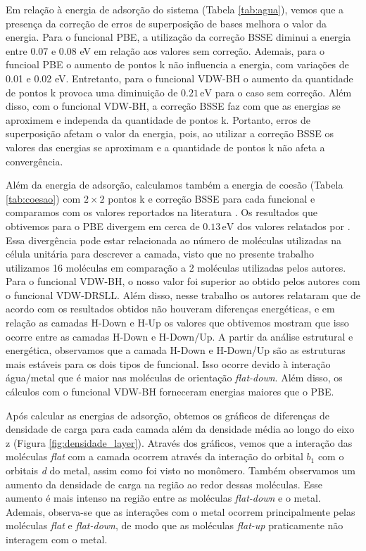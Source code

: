 
Em relação à energia de adsorção do sistema (Tabela \ref{tab:agua}), vemos que a presença da correção de erros de superposição de bases melhora o valor da energia. Para o funcional PBE, a utilização da correção BSSE diminui a energia entre 0.07 e 0.08 eV em relação aos valores sem correção. Ademais, para o funcioal PBE o aumento de pontos k não influencia a energia, com variações de 0.01 e 0.02 eV. Entretanto, para o funcional VDW-BH o aumento da quantidade de pontos k provoca uma diminuição de $ 0.21\,\si{\eV}$ para o caso sem correção. Além disso, com o funcional VDW-BH, a correção BSSE faz com que as energias se aproximem e independa da quantidade de pontos k. Portanto, erros de superposição afetam o valor da energia, pois, ao utilizar a correção BSSE os valores das energias se aproximam e a quantidade de pontos k não afeta a convergência.

Além da energia de adsorção, calculamos também a energia de coesão (Tabela \ref{tab:coesao}) com $2\times2$ pontos k e correção BSSE para cada funcional e comparamos com os valores reportados na literatura \cite{adrien}. Os resultados que obtivemos para o PBE divergem em cerca de $ 0.13\,\si{\eV} $ dos valores relatados por \citeauthor{adrien}. Essa divergência pode estar relacionada ao número de moléculas utilizadas na célula unitária para descrever a camada, visto que no presente trabalho utilizamos 16 moléculas em comparação a 2 moléculas utilizadas pelos autores. Para o funcional VDW-BH, o nosso valor foi superior ao obtido pelos autores com o funcional VDW-DRSLL. Além disso, nesse trabalho os autores relataram que de acordo com os resultados obtidos não houveram diferenças energéticas, e em relação as camadas H-Down e H-Up os valores que obtivemos mostram que isso ocorre entre as camadas H-Down e H-Down/Up. A partir da análise estrutural e energética, observamos que a camada H-Down e H-Down/Up são as estruturas mais estáveis para os dois tipos de funcional. Isso ocorre devido à interação água/metal que é maior nas moléculas de orientação \textit{flat-down}. Além disso, os cálculos com o funcional VDW-BH forneceram energias maiores que o PBE. 



Após calcular as energias de adsorção, obtemos os gráficos de diferenças de densidade de carga para cada camada além da densidade média ao longo do eixo z (Figura \ref{fig:densidade_layer}). Através dos gráficos, vemos que a interação das moléculas \textit{flat} com a camada ocorrem através da interação do orbital $ b_1$ com o orbitais \textit{d} do metal, assim como foi visto no monômero. Também observamos um aumento da densidade de carga na região ao redor dessas moléculas. Esse aumento é mais intenso na região entre as moléculas \textit{flat-down} e o metal. Ademais, observa-se que as interações com o metal ocorrem principalmente pelas moléculas \textit{flat} e \textit{flat-down}, de modo que as moléculas \textit{flat-up} praticamente não interagem com o metal. 


